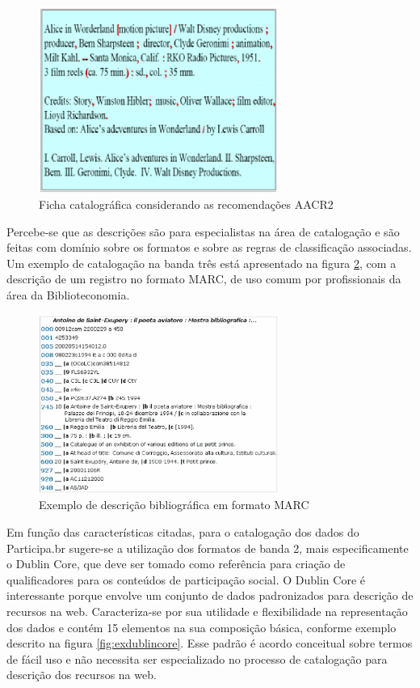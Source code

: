 \graphicspath{{figuras/}}
\begin{figure}[H]
\centering
\includegraphics[width=0.7\textwidth]{aacr2}
\caption{Ficha catalográfica considerando as recomendações AACR2}
\label{fig:aacr2}
\end{figure}

Percebe-se que as descrições são para especialistas na área de catalogação e são feitas com domínio sobre os formatos e sobre as regras de classificação associadas. Um exemplo de catalogação na banda três está apresentado na figura \ref{fig:marc2}, com a descrição de um registro no formato MARC, de uso comum por profissionais da área da Biblioteconomia.

\graphicspath{{figuras/}}
\begin{figure}[H]
\centering
\includegraphics[width=0.7\textwidth]{marc2}
\caption{Exemplo de descrição bibliográfica em formato MARC}
\label{fig:marc2}
\end{figure}

Em função das características citadas, para o catalogação dos dados do Participa.br sugere-se a utilização dos formatos de banda 2, mais especificamente o Dublin Core, que deve ser tomado como referência para criação de qualificadores para os conteúdos de participação social. O Dublin Core é interessante porque envolve um conjunto de dados padronizados para descrição de recursos na web. Caracteriza-se por sua utilidade e flexibilidade na representação dos dados e contém 15 elementos na sua composição básica, conforme exemplo descrito na figura \ref{fig:exdublincore}. Esse padrão é acordo conceitual sobre termos de fácil uso e não necessita ser especializado no processo de catalogação para descrição dos recursos na web.

